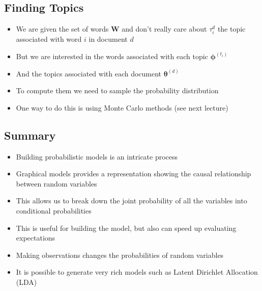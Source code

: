 \begin{slide}
\section{Finding Topics}

\begin{PauseHighLight}
  \begin{itemize}
  \item We are given the set of words $\bm{W}$ and don't really care
    about $\tau_i^d$ the topic associated with word $i$ in document
    $d$\pause
  \item But we are interested in the words associated with each topic
    $\bm{\phi}^{(t_i)}$\pause
  \item And the topics associated with each document
    $\bm{\theta}^{(d)}$\pause
  \item To compute them we need to sample the probability
    distribution\pause
  \item One way to do this is using Monte Carlo methods (see next
    lecture)\pause 
  \end{itemize}
\end{PauseHighLight}

\end{slide}



\begin{slide}
\section[-2]{Summary}

\begin{PauseHighLight}
  \begin{itemize}
  \item Building probabilistic models is an intricate process\pause
  \item Graphical models provides a representation showing the causal
    relationship between random variables\pause
  \item This allows us to break down the joint probability of all the
    variables into conditional probabilities\pause
  \item This is useful for building the model, but also can speed up
    evaluating expectations\pause
  \item Making observations changes the probabilities of random variables\pause
  \item It is possible to generate very rich models such as Latent
    Dirichlet Allocation (LDA)\pause
  \end{itemize}
\end{PauseHighLight}

\end{slide}

